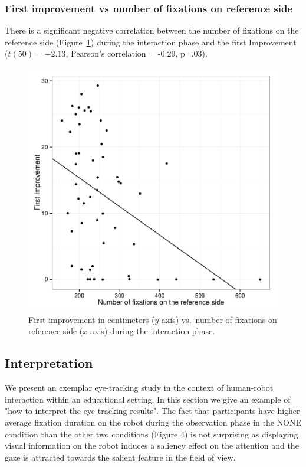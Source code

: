 \documentclass{sig-alternate}
\begin{document}
\subsubsection{First improvement vs number of fixations on reference side}

There is a significant negative correlation between the number of
fixations on the reference side (Figure~\ref{res4}) during the interaction phase
and the first Improvement ($t(50)=-2.13$, Pearson's correlation = -0.29, p=.03).

\begin{figure}[h!]
    \centering
    \includegraphics[width=0.8\linewidth]{corPlotFirstImprove}
    \caption{First improvement in centimeters ($y$-axis) vs.~number of fixations
    on reference side ($x$-axis) during the interaction phase.}
    \label{res4}
\end{figure}


\subsection{Interpretation}

We present an exemplar eye-tracking study in the context of human-robot
interaction within an educational setting. In this section we give an example of
"how to interpret the eye-tracking results". The fact that participants have
higher average fixation duration on the robot during the observation phase in
the {\sf NONE} condition than the other two conditions (Figure 4) is not
surprising as displaying visual information on the robot induces a saliency
effect on the attention and the gaze is attracted towards the salient feature in
the field of view. 
\end{document}
